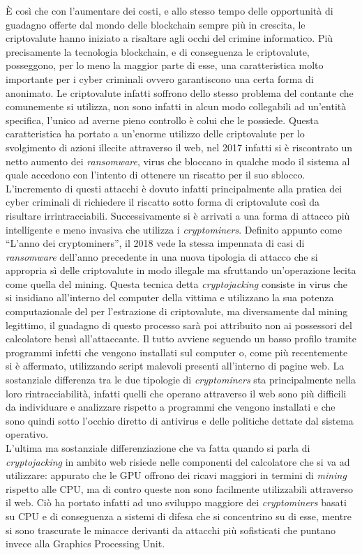 \documentclass[
11pt, %
oneside, %
italian, %
onehalfspacing,%
headsepline, %
]{MastersDoctoralThesis} %
\begin{document}
È così che con l'aumentare dei costi, e allo stesso tempo delle opportunità di guadagno offerte dal mondo delle blockchain sempre più in crescita, le criptovalute hanno iniziato a risaltare agli occhi del crimine informatico. Più precisamente la tecnologia blockchain, e di conseguenza le criptovalute, posseggono, per lo meno la maggior parte di esse, una caratteristica molto importante per i cyber criminali ovvero garantiscono una certa forma di anonimato. Le criptovalute infatti soffrono dello stesso problema del contante che comunemente si utilizza, non sono infatti in alcun modo collegabili ad un'entità specifica, l'unico ad averne pieno controllo è colui che le possiede. Questa caratteristica ha portato a un'enorme utilizzo delle criptovalute per lo svolgimento di azioni illecite attraverso il web, nel 2017 infatti si è riscontrato un netto aumento dei \emph{ransomware}, virus che bloccano in qualche modo il sistema al quale accedono con l'intento di ottenere un riscatto per il suo sblocco. L'incremento di questi attacchi è dovuto infatti principalmente alla pratica dei cyber criminali di richiedere il riscatto sotto forma di criptovalute così da risultare irrintracciabili. Successivamente si è arrivati a una forma di attacco più intelligente e meno invasiva che utilizza i \emph{cryptominers}. Definito appunto come ``L'anno dei cryptominers'', il 2018 vede la stessa impennata di casi di \emph{ransomware} dell'anno precedente in una nuova tipologia di attacco che si appropria sì delle criptovalute in modo illegale ma sfruttando un'operazione lecita come quella del mining. Questa tecnica detta \emph{cryptojacking} consiste in virus che si insidiano all'interno del computer della vittima e utilizzano la sua potenza computazionale del per l'estrazione di criptovalute, ma diversamente dal mining legittimo, il guadagno di questo processo sarà poi attribuito non ai possessori del calcolatore bensì all'attaccante. Il tutto avviene seguendo un basso profilo tramite programmi infetti che vengono installati sul computer o, come più recentemente si è affermato, utilizzando script malevoli presenti all'interno di pagine web. La sostanziale differenza tra le due tipologie di \emph{cryptominers} sta principalmente nella loro rintracciabilità, infatti quelli che operano attraverso il web sono più difficili da individuare e analizzare rispetto a programmi che vengono installati e che sono quindi sotto l'occhio diretto di antivirus e delle politiche dettate dal sistema operativo.\\
L'ultima ma sostanziale differenziazione che va fatta quando si parla di \emph{cryptojacking} in ambito web risiede nelle componenti del calcolatore che si va ad utilizzare: appurato che le GPU offrono dei ricavi maggiori in termini di \emph{mining} rispetto alle CPU, ma di contro queste non sono facilmente utilizzabili attraverso il web. Ciò ha portato infatti ad uno sviluppo maggiore dei \emph{cryptominers} basati su CPU e di conseguenza a sistemi di difesa che si concentrino su di esse, mentre si sono trascurate le minacce derivanti da attacchi più sofisticati che puntano invece alla Graphics Processing Unit.\\
\end{document}
